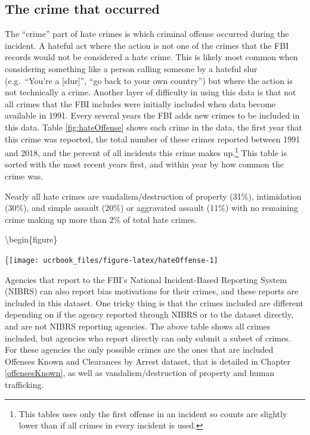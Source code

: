 \documentclass[
  12pt,
  openany]{book}
\begin{document}
\hypertarget{the-crime-that-occurred}{%
\subsection{The crime that occurred}\label{the-crime-that-occurred}}

The ``crime'' part of hate crimes is which criminal offense occurred during the incident. A hateful act where the action is not one of the crimes that the FBI records would not be considered a hate crime. This is likely most common when considering something like a person calling someone by a hateful slur (e.g.~``You're a {[}slur{]}'', ``go back to your own country'') but where the action is not technically a crime. Another layer of difficulty in using this data is that not all crimes that the FBI includes were initially included when data become available in 1991. Every several years the FBI adds new crimes to be included in this data. Table \ref{fig:hateOffense} shows each crime in the data, the first year that this crime was reported, the total number of these crimes reported between 1991 and 2018, and the percent of all incidents this crime makes up.\footnote{This tables uses only the first offense in an incident so counts are slightly lower than if all crimes in every incident is used.} This table is sorted with the most recent years first, and within year by how common the crime was.

Nearly all hate crimes are vandalism/destruction of property (31\%), intimidation (30\%), and simple assault (20\%) or aggravated assault (11\%) with no remaining crime making up more than 2\% of total hate crimes.

\textbackslash begin\{figure\}

\{\centering \texttt{[image: ucrbook\_files/figure-latex/hateOffense-1]}

Agencies that report to the FBI's National Incident-Based Reporting System (NIBRS) can also report bias motivations for their crimes, and these reports are included in this dataset. One tricky thing is that the crimes included are different depending on if the agency reported through NIBRS or to the dataset directly, and are not NIBRS reporting agencies. The above table shows all crimes included, but agencies who report directly can only submit a subset of crimes. For these agencies the only possible crimes are the ones that are included Offenses Known and Clearances by Arrest dataset, that is detailed in Chapter \ref{offensesKnown}, as well as vandalism/destruction of property and human trafficking.
\end{document}
